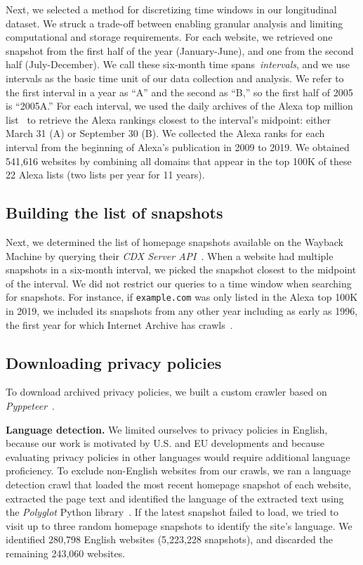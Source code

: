 Next, we selected a method for discretizing time windows in our longitudinal dataset. We struck a trade-off between enabling granular analysis and limiting computational and storage requirements. For each website, we retrieved one snapshot from the first half of the year (January-June), and one from the second half (July-December). We call these six-month time spans~\emph{intervals}, and we use intervals as the basic time unit of our data collection and analysis. We refer to the first interval in a year as ``A'' and the second as ``B,'' so the first half of 2005 is ``2005A.''
For each interval, we used the daily archives of the Alexa top million list~\cite{naab2019prefix} to retrieve the Alexa rankings closest to the interval's midpoint: either March 31 (A) or September 30 (B).
We collected the Alexa ranks for each interval from the beginning of Alexa’s publication in 2009 to 2019.
We obtained 541,616 websites by combining all domains that appear in the top 100K of these 22 Alexa lists (two lists per year for 11 years).

\subsection{Building the list of snapshots}
\label{subsec:ppot:snapshot-retrieval}
Next, we determined the list of homepage snapshots available on the Wayback Machine
by querying their \emph{CDX Server API}~\cite{wayback-cdx-api}.
When a website had multiple snapshots in a six-month interval, we picked the snapshot closest to the midpoint of the interval.
We did not restrict our queries to a time window when searching for snapshots.
For instance, if {\tt example.com} was only listed in the Alexa top 100K in 2019,
we included its snapshots from any other year including as early as 1996, the first year for which Internet Archive has crawls~\cite{WaybackMachineGeneralInformation}.

\subsection{Downloading privacy policies}
\label{subsec:ppot:download-policies}
To download archived privacy policies, we built a custom crawler based on 
\emph{Pyppeteer}~\cite{miyakogi2019May}.


{\textbf{Language detection.}}
We limited ourselves to privacy policies in English, because our work is motivated by U.S. and EU developments and because evaluating privacy policies in other languages would require additional language proficiency. To exclude non-English websites from our crawls, we ran a language detection crawl that loaded the most recent homepage snapshot of each website, extracted the page text and identified the language of the extracted text using the \emph{Polyglot} Python library~\cite{polyglot-pypi}. If the latest snapshot failed to load, we tried to visit up to three random homepage snapshots to identify the site's language. 
We identified 280,798 English websites (5,223,228 snapshots),
and discarded the remaining 243,060 websites.


